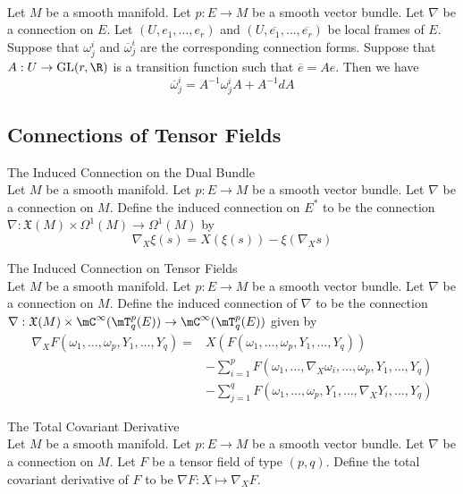 \documentclass[a4paper]{article}
\begin{document}
\begin{prp}{}{}\\
Let $M$ be a smooth manifold. Let $p:E\to M$ be a smooth vector bundle. Let $\nabla$ be a connection on $E$. Let $(U,e_1,\dots,e_r)$ and $(U,\overline{e_1},\dots,\overline{e_r})$ be local frames of $E$. Suppose that $\omega_j^i$ and $\overline{\omega}_j^i$ are the corresponding connection forms. Suppose that $A:U\to\text{GL}(r,\R)$ is a transition function such that $\overline{e}=Ae$. Then we have $$\overline{\omega}_j^i=A^{-1}\omega_j^i A+A^{-1}dA$$
\end{prp}

\subsection{Connections of Tensor Fields}
\begin{defn}{The Induced Connection on the Dual Bundle}{}\\
Let $M$ be a smooth manifold. Let $p:E\to M$ be a smooth vector bundle. Let $\nabla$ be a connection on $M$. Define the induced connection on $E^\ast$ to be the connection $\nabla:\mathfrak{X}(M)\times\Omega^1(M)\to\Omega^1(M)$ by $$\nabla_X\xi(s)=X(\xi(s))-\xi(\nabla_Xs)$$
\end{defn}

\begin{defn}{The Induced Connection on Tensor Fields}{}\\
Let $M$ be a smooth manifold. Let $p:E\to M$ be a smooth vector bundle. Let $\nabla$ be a connection on $M$. Define the induced connection of $\nabla$ to be the connection $\nabla:\mathfrak{X}(M)\times\mC^\infty(\mT_q^p(E))\to\mC^\infty(\mT_q^p(E))$ given by 
\begin{align*}
\nabla_XF(\omega_1,\dots,\omega_p,Y_1,\dots,Y_q)=&X(F(\omega_1,\dots,\omega_p,Y_1,\dots,Y_q))\\
&-\sum_{i=1}^pF(\omega_1,\dots,\nabla_X\omega_i,\dots,\omega_p,Y_1,\dots,Y_q)\\
&-\sum_{j=1}^qF(\omega_1,\dots,\omega_p,Y_1,\dots,\nabla_XY_i,\dots,Y_q)
\end{align*}
\end{defn}

\begin{defn}{The Total Covariant Derivative}{}\\
Let $M$ be a smooth manifold. Let $p:E\to M$ be a smooth vector bundle. Let $\nabla$ be a connection on $M$. Let $F$ be a tensor field of type $(p,q)$. Define the total covariant derivative of $F$ to be $\nabla F:X\mapsto\nabla_XF$. 
\end{defn}
\end{document}
